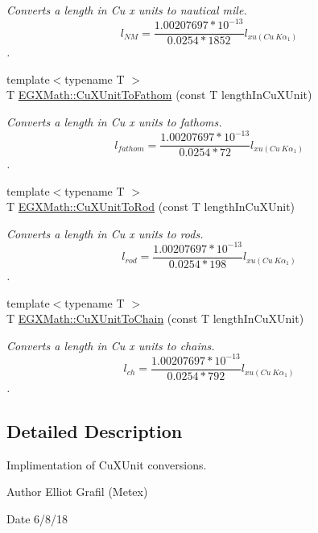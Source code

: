 \begin{DoxyCompactItemize}
\begin{DoxyCompactList}\small\item\em Converts a length in Cu x units to nautical mile. \[ l_{NM}= \frac{1.00207697*10^{-13}}{0.0254 * 1852} l_{xu(Cu\ K\alpha_1)} \]. \end{DoxyCompactList}\item 
{\footnotesize template$<$typename T $>$ }\\T \mbox{\hyperlink{group___e_g_x_math-_conversions-_length_conversions-_non-_s_i-_cu_x_unit-_nautical_ga7a3671693beab30a832008ca1294732f}{E\+G\+X\+Math\+::\+Cu\+X\+Unit\+To\+Fathom}} (const T length\+In\+Cu\+X\+Unit)
\begin{DoxyCompactList}\small\item\em Converts a length in Cu x units to fathoms. \[ l_{fathom}= \frac{1.00207697*10^{-13}}{0.0254 * 72} l_{xu(Cu\ K\alpha_1)} \]. \end{DoxyCompactList}\item 
{\footnotesize template$<$typename T $>$ }\\T \mbox{\hyperlink{group___e_g_x_math-_conversions-_length_conversions-_non-_s_i-_cu_x_unit-_surveyors_ga3506ca573e8ba770792a7cf123bceb79}{E\+G\+X\+Math\+::\+Cu\+X\+Unit\+To\+Rod}} (const T length\+In\+Cu\+X\+Unit)
\begin{DoxyCompactList}\small\item\em Converts a length in Cu x units to rods. \[ l_{rod}= \frac{1.00207697*10^{-13}}{0.0254 * 198} l_{xu(Cu\ K\alpha_1)} \]. \end{DoxyCompactList}\item 
{\footnotesize template$<$typename T $>$ }\\T \mbox{\hyperlink{group___e_g_x_math-_conversions-_length_conversions-_non-_s_i-_cu_x_unit-_surveyors_ga504934f43d4950cb582134d718952f3b}{E\+G\+X\+Math\+::\+Cu\+X\+Unit\+To\+Chain}} (const T length\+In\+Cu\+X\+Unit)
\begin{DoxyCompactList}\small\item\em Converts a length in Cu x units to chains. \[ l_{ch}= \frac{1.00207697*10^{-13}}{0.0254 * 792} l_{xu(Cu\ K\alpha_1)} \]. \end{DoxyCompactList}\end{DoxyCompactItemize}


\subsection{Detailed Description}
Implimentation of Cu\+X\+Unit conversions. 

\begin{DoxyAuthor}{Author}
Elliot Grafil (Metex) 
\end{DoxyAuthor}
\begin{DoxyDate}{Date}
6/8/18 
\end{DoxyDate}
